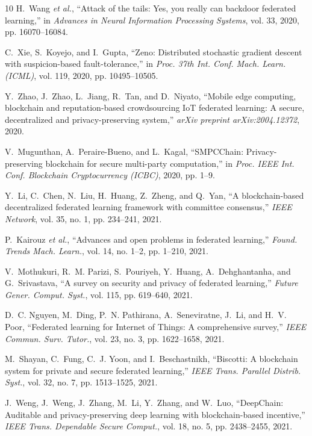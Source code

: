 \documentclass[12pt,a4paper,onecolumn]{article}
\begin{document}
\begin{thebibliography}{10}
H.~Wang \emph{et al.},
``Attack of the tails: Yes, you really can backdoor federated learning,''
in \emph{Advances in Neural Information Processing Systems}, vol. 33, 2020, pp. 16070--16084.

C.~Xie, S.~Koyejo, and I.~Gupta,
``Zeno: Distributed stochastic gradient descent with suspicion-based fault-tolerance,''
in \emph{Proc. 37th Int. Conf. Mach. Learn. (ICML)}, vol. 119, 2020, pp. 10495--10505.

Y.~Zhao, J.~Zhao, L.~Jiang, R.~Tan, and D.~Niyato,
``Mobile edge computing, blockchain and reputation-based crowdsourcing IoT federated learning: A secure, decentralized and privacy-preserving system,''
\emph{arXiv preprint arXiv:2004.12372}, 2020.

V.~Mugunthan, A.~Peraire-Bueno, and L.~Kagal,
``SMPCChain: Privacy-preserving blockchain for secure multi-party computation,''
in \emph{Proc. IEEE Int. Conf. Blockchain Cryptocurrency (ICBC)}, 2020, pp. 1--9.

Y.~Li, C.~Chen, N.~Liu, H.~Huang, Z.~Zheng, and Q.~Yan,
``A blockchain-based decentralized federated learning framework with committee consensus,''
\emph{IEEE Network}, vol. 35, no. 1, pp. 234--241, 2021.

P.~Kairouz \emph{et al.},
``Advances and open problems in federated learning,''
\emph{Found. Trends Mach. Learn.}, vol. 14, no. 1--2, pp. 1--210, 2021.

V.~Mothukuri, R.~M. Parizi, S.~Pouriyeh, Y.~Huang, A.~Dehghantanha, and G.~Srivastava,
``A survey on security and privacy of federated learning,''
\emph{Future Gener. Comput. Syst.}, vol. 115, pp. 619--640, 2021.

D.~C. Nguyen, M.~Ding, P.~N. Pathirana, A.~Seneviratne, J.~Li, and H.~V. Poor,
``Federated learning for Internet of Things: A comprehensive survey,''
\emph{IEEE Commun. Surv. Tutor.}, vol. 23, no. 3, pp. 1622--1658, 2021.

M.~Shayan, C.~Fung, C.~J. Yoon, and I.~Beschastnikh,
``Biscotti: A blockchain system for private and secure federated learning,''
\emph{IEEE Trans. Parallel Distrib. Syst.}, vol. 32, no. 7, pp. 1513--1525, 2021.

J.~Weng, J.~Weng, J.~Zhang, M.~Li, Y.~Zhang, and W.~Luo,
``DeepChain: Auditable and privacy-preserving deep learning with blockchain-based incentive,''
\emph{IEEE Trans. Dependable Secure Comput.}, vol. 18, no. 5, pp. 2438--2455, 2021.


\end{thebibliography}
\end{document}
